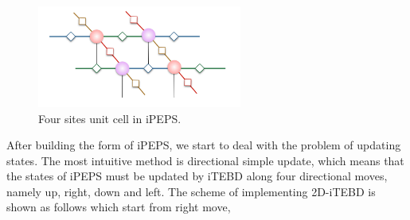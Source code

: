 \begin{figure}[ht]
	\centering
	\includegraphics[width=0.6\textwidth]{figures/fig314.png}
	\caption[The tensor diagrams of 2-D lattice]{Four sites unit cell in iPEPS.}
	\label{fig315}
\end{figure}

After building the form of iPEPS, we start to deal with the problem of updating states. The most intuitive method is directional simple update, which means that the states of iPEPS must be updated by iTEBD along four directional moves, namely up, right, down and left. The scheme of implementing 2D-iTEBD is shown as follows which start from right move,

